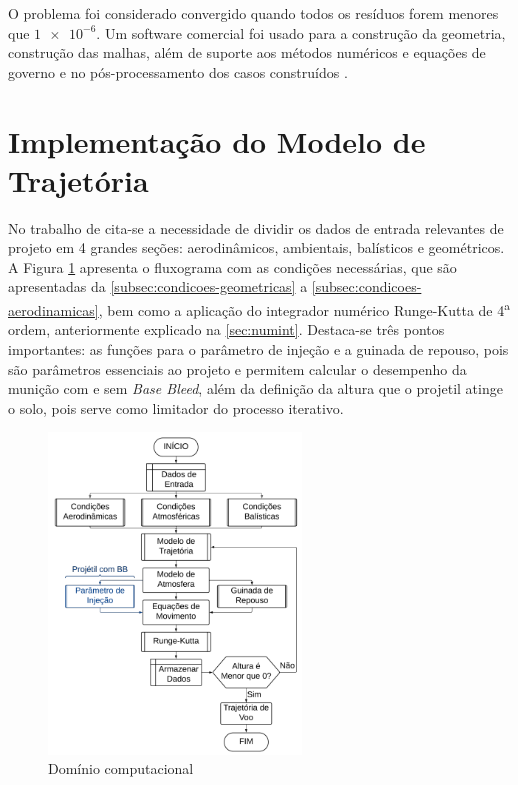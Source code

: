 O problema foi considerado convergido quando todos os resíduos forem menores que $\num{1e-6}$. Um software comercial foi usado para a construção da geometria, construção das malhas, além de suporte aos métodos numéricos e equações de governo e no pós-processamento dos casos construídos \cite{fluent2021ansys}.

\section{Implementação do Modelo de Trajetória}\label{subsec:implementacao-trajetoria}

No trabalho de \citeauthor{Rosendo2020} cita-se a necessidade de dividir os dados de entrada relevantes de projeto em 4 grandes seções: aerodinâmicos, ambientais, balísticos e geométricos. A Figura \ref{fig:fluxograma-mpmtm} apresenta o fluxograma com as condições necessárias, que são apresentadas da \autoref{subsec:condicoes-geometricas} a \autoref{subsec:condicoes-aerodinamicas}, bem como a aplicação do integrador numérico Runge-Kutta de 4\textsuperscript{a} ordem, anteriormente explicado na \autoref{sec:numint}. Destaca-se três pontos importantes: as funções para o parâmetro de injeção e a guinada de repouso, pois são parâmetros essenciais ao projeto e permitem calcular o desempenho da munição com e sem \textit{Base Bleed}, além da definição da altura que o projetil atinge o solo, pois serve como limitador do processo iterativo. 

\begin{figure}[!ht]
	\centering
	\includegraphics[width=0.6\textwidth]{foto03-fluxograma-mpmtm.png}
	\caption{Domínio computacional}
	\label{fig:fluxograma-mpmtm}
\end{figure}

